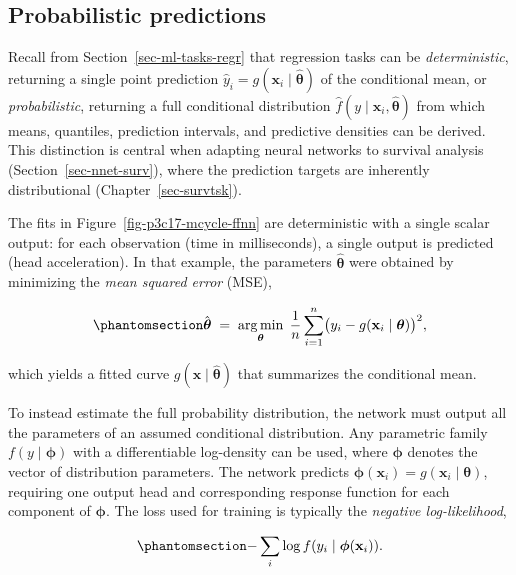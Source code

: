 \documentclass[
  letterpaper,
  krantz2]{style/krantz}
\begin{document}
\subsection{Probabilistic
predictions}\label{sec-nnet-deterministic-vs-probabilistic}

Recall from Section~\ref{sec-ml-tasks-regr} that regression tasks can be
\emph{deterministic}, returning a single
point prediction
\(\hat{y}_i = g(\mathbf{x}_i \mid \hat{\boldsymbol{\theta}})\) of the
conditional mean, or
\emph{probabilistic}, returning a full
conditional distribution
\(\hat{f}(y \mid \mathbf{x}_i, \hat{\boldsymbol{\theta}})\) from which
means, quantiles, prediction intervals, and predictive densities can be
derived. This distinction is central when adapting neural networks to
survival analysis (Section~\ref{sec-nnet-surv}), where the prediction
targets are inherently distributional (Chapter~\ref{sec-survtsk}).

The fits in Figure~\ref{fig-p3c17-mcycle-ffnn} are deterministic with a
single scalar output: for each observation (time in milliseconds), a
single output is predicted (head acceleration). In that example, the
parameters \(\hat{\boldsymbol{\theta}}\) were obtained by minimizing the
\emph{mean squared error} (MSE), 

\begin{equation}\phantomsection\label{eq-nnet-mse}{
\hat{\boldsymbol{\theta}} \;=\; \mathop{\mathrm{arg\,min}}_{\boldsymbol{\theta}}\; \frac{1}{n}\sum_{i=1}^{n}\bigl(y_i - g(\mathbf{x}_i \mid \boldsymbol{\theta})\bigr)^{2},
}\end{equation}

which yields a fitted curve
\(g(\mathbf{x}\mid \hat{\boldsymbol{\theta}})\) that summarizes the
conditional mean.

To instead estimate the full probability distribution, the network must
output all the parameters of an assumed conditional distribution. Any
parametric family \(f(y \mid \boldsymbol{\phi})\) with a differentiable
log-density can be used, where \(\boldsymbol{\phi}\) denotes the vector
of distribution parameters. The network predicts
\(\boldsymbol{\phi}(\mathbf{x}_i) = g(\mathbf{x}_i \mid \boldsymbol{\theta})\),
requiring one output head and corresponding response function for each
component of \(\boldsymbol{\phi}\). The loss used for training is
typically the \emph{negative log-likelihood},

\begin{equation}\phantomsection\label{eq-nnet-nll}{
-\sum_i \log f(y_i \mid \boldsymbol{\phi}(\mathbf{x}_i)).
}\end{equation}
\end{document}
